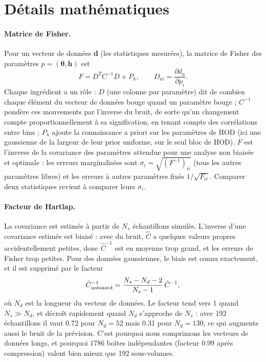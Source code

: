 \section{Détails mathématiques}
\label{app:maths}

\paragraph{Matrice de Fisher.} Pour un vecteur de données $\boldsymbol d$ (les statistiques mesurées), la matrice de Fisher des paramètres $p=(\boldsymbol\theta,\boldsymbol h)$ est
\begin{equation}
F = D^T C^{-1} D + P_h, \qquad D_{ai} = \frac{\partial d_a}{\partial p_i}.
\end{equation}
Chaque ingrédient a un rôle : $D$ (une colonne par paramètre) dit de combien chaque élément du vecteur de données bouge quand un paramètre bouge ; $C^{-1}$ pondère ces mouvements par l'inverse du bruit, de sorte qu'un changement compte proportionnellement à sa signification, en tenant compte des corrélations entre bins ; $P_h$ ajoute la connaissance a priori sur les paramètres de HOD (ici une gaussienne de la largeur de leur prior uniforme, sur le seul bloc de HOD). $F$ est l'inverse de la covariance des paramètres attendue pour une analyse non biaisée et optimale : les erreurs marginalisées sont $\sigma_i=\sqrt{(F^{-1})_{ii}}$ (tous les autres paramètres libres) et les erreurs à autres paramètres fixés $1/\sqrt{F_{ii}}$. Comparer deux statistiques revient à comparer leurs $\sigma_i$.

\paragraph{Facteur de Hartlap.} La covariance est estimée à partir de $N_s$ échantillons simulés. L'inverse d'une covariance estimée est biaisé : avec du bruit, $\hat C$ a quelques valeurs propres accidentellement petites, donc $\hat C^{-1}$ est en moyenne trop grand, et les erreurs de Fisher trop petites. Pour des données gaussiennes, le biais est connu exactement, et il est supprimé par le facteur \cite{Hartlap2007}
\begin{equation}
\hat C^{-1}_{\rm unbiased} = \frac{N_s-N_d-2}{N_s-1}\,\hat C^{-1},
\end{equation}
où $N_d$ est la longueur du vecteur de données. Le facteur tend vers 1 quand $N_s\gg N_d$, et décroît rapidement quand $N_d$ s'approche de $N_s$ : avec 192 échantillons il vaut 0.72 pour $N_d=52$ mais 0.31 pour $N_d=130$, ce qui augmente aussi le bruit de la prévision. C'est pourquoi nous comprimons les vecteurs de données longs, et pourquoi 1786 boîtes indépendantes (facteur 0.99 après compression) valent bien mieux que 192 sous-volumes.

